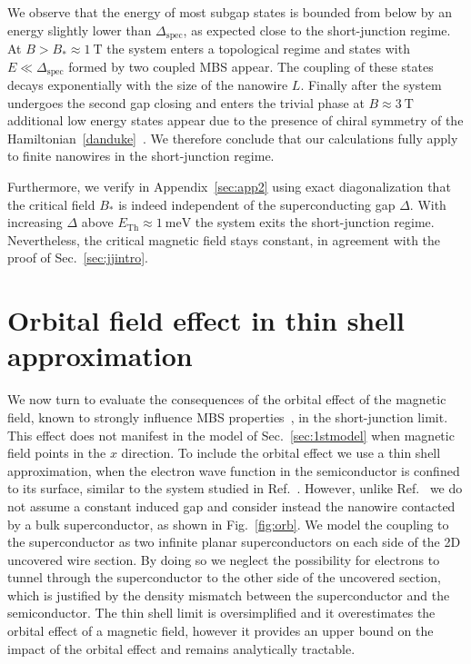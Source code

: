 We observe that the energy of most subgap states is bounded from below by an energy slightly lower than $\Delta_\textrm{spec}$, as expected close to the short-junction regime.
At $B > B_* \approx \SI{1}{\tesla}$ the system enters a topological regime and states with $E \ll \Delta_\textrm{spec}$ formed by two coupled MBS appear.
The coupling of these states decays exponentially with the size of the nanowire $L$.
Finally after the system undergoes the second gap closing and enters the trivial phase at $B \approx \SI{3}{\tesla}$ additional low energy states appear due to the presence of chiral symmetry of the Hamiltonian~\eqref{danduke}~\cite{Schnyder2009, Ryu2010, Tewari2012}.
We therefore conclude that our calculations fully apply to finite nanowires in the short-junction regime.

Furthermore, we verify in Appendix~\ref{sec:app2} using exact diagonalization that the critical field $B_*$ is indeed independent of the superconducting gap $\Delta$.
With increasing $\Delta$ above $E_\mathrm{Th}\approx \SI{1}{\meV}$ the system exits the short-junction regime.
Nevertheless, the critical magnetic field stays constant, in agreement with the proof of Sec.~\ref{sec:jjintro}.

\section{Orbital field effect in thin shell approximation}
\label{sec:orb}

We now turn to evaluate the consequences of the orbital effect of the magnetic field, known to strongly influence MBS properties~\cite{Lim2013, Osca2014b, Osca2015, Nijholt2016}, in the short-junction limit.
This effect does not manifest in the model of Sec.~\ref{sec:1stmodel} when magnetic field points in the $x$ direction.
To include the orbital effect we use a thin shell approximation, when the electron wave function in the semiconductor is confined to its surface, similar to the system studied in Ref.~\cite{Osca2014b}.
However, unlike Ref.~\cite{Osca2014b} we do not assume a constant induced gap and consider instead the nanowire contacted by a bulk superconductor, as shown in Fig.~\ref{fig:orb}.
We model the coupling to the superconductor as two infinite planar superconductors on each side of the 2D uncovered wire section.
By doing so we neglect the possibility for electrons to tunnel through the superconductor to the other side of the uncovered section, which is justified by the density mismatch between the superconductor and the semiconductor.
The thin shell limit is oversimplified and it overestimates the orbital effect of a magnetic field, however it provides an upper bound on the impact of the orbital effect and remains analytically tractable.

